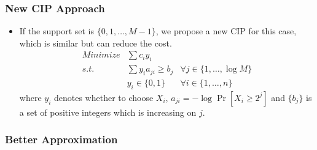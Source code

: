 \documentclass[serif,envcountsect]{beamer}
\begin{document}
\begin{frame}\frametitle{New CIP Approach}
\begin{itemize}
\item If the support set is $\{0, 1, \ldots, M - 1\}$, we propose a new CIP for this case, which is similar but can reduce the cost.
\begin{align*}
Minimize & \sum c_i y_i &\\
s.t. & \sum y_i a_{ji} \geq b_j & \forall j\in\{1, \ldots, \log M\}\\
& y_i \in \{0,1\} &\forall i\in\{1, \ldots, n\}
\end{align*}
where $y_i$ denotes whether to choose $X_i$, $a_{ji} = -\log \Pr[X_i \geq 2^{j}]$ and $\{b_j\}$ is a set of positive integers which is increasing on $j$.
\end{itemize}
\end{frame}
%

\begin{frame}\frametitle{Better Approximation}
\end{frame}
\end{document}

